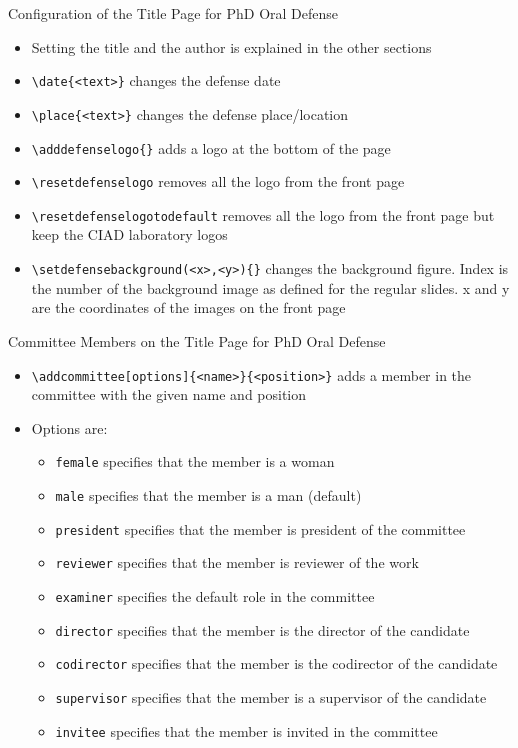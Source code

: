 \documentclass[english,sectioncirclenumberstyle]{ciadbeamer}
\begin{document}
\begin{frame}{{Configuration} of the Title Page for PhD Oral Defense}
	\begin{itemize}
	\item Setting the title and the author is explained in the other sections
	\item \texttt{{\textbackslash}date\{<text>\}} changes the defense date
	\item \texttt{{\textbackslash}place\{<text>\}} changes the defense place/location
	\item \texttt{{\textbackslash}adddefenselogo\{<image path>\}} adds a logo at the bottom of the page
	\item \texttt{{\textbackslash}resetdefenselogo} removes all the logo from the front page
	\item \texttt{{\textbackslash}resetdefenselogotodefault} removes all the logo from the front page but keep the CIAD laboratory logos
	\item \texttt{{\textbackslash}setdefensebackground(<x>,<y>)\{<background index>\}} changes the background figure. Index is the number of the background image as defined for the regular slides. x and y are the coordinates of the images on the front page
	\end{itemize}
\end{frame}

\begin{frame}{{Committee Members} on the Title Page for PhD Oral Defense}
	\begin{itemize}
	\item \texttt{{\textbackslash}addcommittee[options]\{<name>\}\{<position>\}} adds a member in the committee with the given name and position
	\item Options are:
		\begin{itemize}
		\item \texttt{female} specifies that the member is a woman
		\item \texttt{male} specifies that the member is a man (default)
		\item \texttt{president} specifies that the member is president of the committee
		\item \texttt{reviewer} specifies that the member is reviewer of the work
		\item \texttt{examiner} specifies the default role in the committee
		\item \texttt{director} specifies that the member is the director of the candidate
		\item \texttt{codirector} specifies that the member is the codirector of the candidate
		\item \texttt{supervisor} specifies that the member is a supervisor of the candidate
		\item \texttt{invitee} specifies that the member is invited in the committee
		\end{itemize}
	\end{itemize}
\end{frame}
\end{document}
